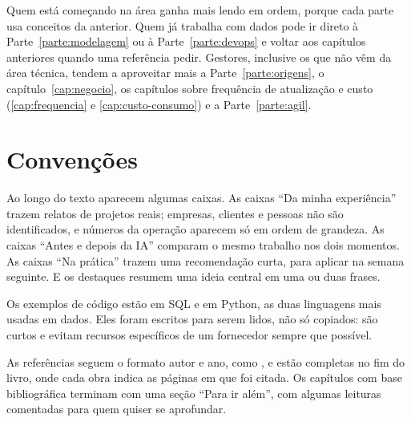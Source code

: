 Quem está começando na área ganha mais lendo em ordem, porque cada parte usa conceitos da
anterior. Quem já trabalha com dados pode ir direto à Parte~\ref{parte:modelagem} ou à
Parte~\ref{parte:devops} e voltar aos capítulos anteriores quando uma referência pedir.
Gestores, inclusive os que não vêm da área técnica, tendem a aproveitar mais a
Parte~\ref{parte:origens}, o capítulo~\ref{cap:negocio}, os capítulos sobre frequência de
atualização e custo (\ref{cap:frequencia} e \ref{cap:custo-consumo}) e a
Parte~\ref{parte:agil}.

\section*{Convenções}

Ao longo do texto aparecem algumas caixas. As caixas \enquote{Da minha experiência}
trazem relatos de projetos reais; empresas, clientes e pessoas não são identificados, e
números da operação aparecem só em ordem de grandeza. As caixas \enquote{Antes e depois
da IA} comparam o mesmo trabalho nos dois momentos. As caixas \enquote{Na prática} trazem
uma recomendação curta, para aplicar na semana seguinte. E os destaques resumem uma ideia
central em uma ou duas frases.

Os exemplos de código estão em SQL e em Python, as duas linguagens mais usadas em dados.
Eles foram escritos para serem lidos, não só copiados: são curtos e evitam recursos
específicos de um fornecedor sempre que possível.

As referências seguem o formato autor e ano, como \textcite{kimball2013}, e estão
completas no fim do livro, onde cada obra indica as páginas em que foi citada. Os
capítulos com base bibliográfica terminam com uma seção \enquote{Para ir além}, com
algumas leituras comentadas para quem quiser se aprofundar.
